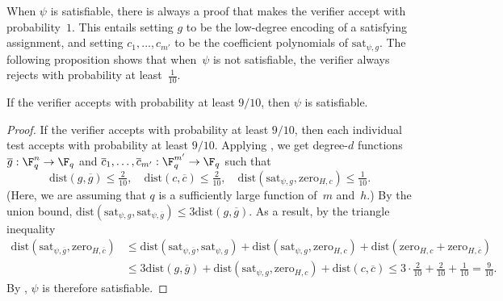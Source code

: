 When $\psi$ is satisfiable, there is always a proof that makes the verifier accept with probability~$1$.
This entails setting $g$ to be the low-degree encoding of a satisfying assignment,
and setting $c_1, \ldots, c_{m'}$ to be the coefficient polynomials of $\mathrm{sat}_{\psi,g}$.
The following proposition shows that when~$\psi$ is not satisfiable, the verifier always rejects with probability at least~$\tfrac{1}{10}$.
\begin{proposition}
If the verifier accepts with probability at least $9/10$, then $\psi$ is satisfiable.
\end{proposition}
\begin{proof}
If the verifier accepts with probability at least $9/10$,
then each individual test accepts with probability at least $9/10$.
Applying ,
we get degree-$d$ functions $\overline{g}:\F_q^n \rightarrow \F_q$ and $\overline{c}_1, \ldots, \overline{c}_{m'}:\F_q^{m'} \rightarrow \F_q$
such that
\begin{equation*}
\mathrm{dist}(g, \overline{g}) \leq \tfrac{2}{10}, \quad
\mathrm{dist}(c, \overline{c}) \leq \tfrac{2}{10}, \quad
\mathrm{dist}(\mathrm{sat}_{\psi,g}, \mathrm{zero}_{H,c}) \leq \tfrac{1}{10}.
\end{equation*}
(Here, we are assuming that $q$ is a sufficiently large function of~$m$ and~$h$.)
By the union bound, $\mathrm{dist}(\mathrm{sat}_{\psi,g}, \mathrm{sat}_{\psi,\overline{g}}) \leq 3\mathrm{dist}(g, \overline{g})$.
As a result, by the triangle inequality
\begin{align*}
\mathrm{dist}(\mathrm{sat}_{\psi,\overline{g}}, \mathrm{zero}_{H,\overline{c}})
&\leq \mathrm{dist}(\mathrm{sat}_{\psi,\overline{g}}, \mathrm{sat}_{\psi, g}) +
	\mathrm{dist}(\mathrm{sat}_{\psi, g}, \mathrm{zero}_{H,c})+
	\mathrm{dist}(\mathrm{zero}_{H,c} + \mathrm{zero}_{H,\overline{c}})\\
&\leq 3 \mathrm{dist}(g, \overline{g})+
	\mathrm{dist}(\mathrm{sat}_{\psi, g}, \mathrm{zero}_{H,c})+
	\mathrm{dist}(c, \overline{c}) \leq 3 \cdot \tfrac{2}{10} + \tfrac{2}{10} + \tfrac{1}{10} = \tfrac{9}{10}.
\end{align*}
By , $\psi$ is therefore satisfiable.
\end{proof}

